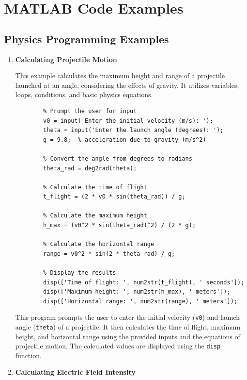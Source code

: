 \documentclass[
11pt, %
a4paper, %
oneside, %
headinclude,footinclude, %
BCOR5mm, %
]{scrartcl}
\begin{document}
\section{MATLAB Code Examples}
\subsection{Physics Programming Examples}

\begin{enumerate}
	\item \textbf{Calculating Projectile Motion}
	
	This example calculates the maximum height and range of a projectile launched at an angle, considering the effects of gravity. It utilizes variables, loops, conditions, and basic physics equations.
	
	\begin{verbatim}
		% Prompt the user for input
		v0 = input('Enter the initial velocity (m/s): ');
		theta = input('Enter the launch angle (degrees): ');
		g = 9.8;  % acceleration due to gravity (m/s^2)
		
		% Convert the angle from degrees to radians
		theta_rad = deg2rad(theta);
		
		% Calculate the time of flight
		t_flight = (2 * v0 * sin(theta_rad)) / g;
		
		% Calculate the maximum height
		h_max = (v0^2 * sin(theta_rad)^2) / (2 * g);
		
		% Calculate the horizontal range
		range = v0^2 * sin(2 * theta_rad) / g;
		
		% Display the results
		disp(['Time of flight: ', num2str(t_flight), ' seconds']);
		disp(['Maximum height: ', num2str(h_max), ' meters']);
		disp(['Horizontal range: ', num2str(range), ' meters']);
	\end{verbatim}
	
	This program prompts the user to enter the initial velocity (\texttt{v0}) and launch angle (\texttt{theta}) of a projectile. It then calculates the time of flight, maximum height, and horizontal range using the provided inputs and the equations of projectile motion. The calculated values are displayed using the \texttt{disp} function.
	
	\item \textbf{Calculating Electric Field Intensity}
	

\end{enumerate}
\end{document}

